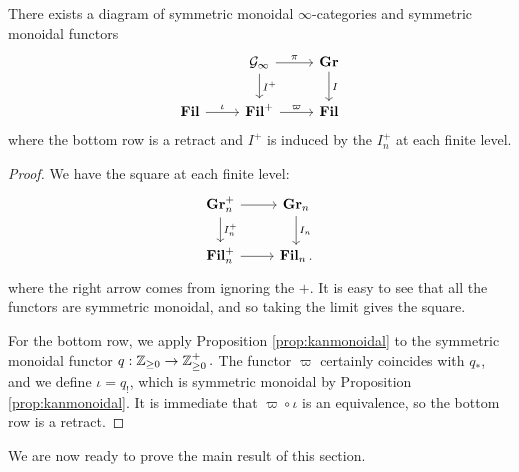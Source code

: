 \begin{prop}\label{prop:MonRet}
There exists a diagram of symmetric monoidal $\infty$-categories and symmetric monoidal functors 
$$
\begin{tikzcd}
&\mathcal{G}_\infty \arrow[r,"\pi"] \arrow[d, "I^+"]&  \Gr \arrow[d, "I"]\\
\Fil \arrow[r,"\iota"] & \Fil^+ \arrow[r,"\varpi"]& \Fil
\end{tikzcd}
$$
where the bottom row is a retract and $I^+$ is induced by the $I_n^+$ at each finite level.  
\end{prop} 
\begin{proof}

We have the square at each finite level: %
$$
\begin{tikzcd}
\Gr_{n}^+ \arrow[r] \arrow[d,"I_n^{+}"] & \Gr_{n} \arrow[d,"I_n"]\\
\Fil_n^+  \arrow[r] & \Fil_n .
\end{tikzcd}
$$
where the right arrow comes from ignoring the $+$.  It is easy to see that all the functors are symmetric monoidal, and so taking the limit gives the square.  

For the bottom row, we apply Proposition \ref{prop:kanmonoidal} to the symmetric monoidal functor $q:\operatorname{\mathbb{Z}}_{\geq 0} \to \operatorname{\mathbb{Z}}_{\geq 0}^+.$  The functor $\varpi$ certainly coincides with $q_*$, and we define $\iota = q_!$, which is symmetric monoidal by Proposition \ref{prop:kanmonoidal}.  It is immediate that $\varpi \circ \iota$ is an equivalence, so the bottom row is a retract.  

\end{proof}


We are now ready to prove the main result of this section.

